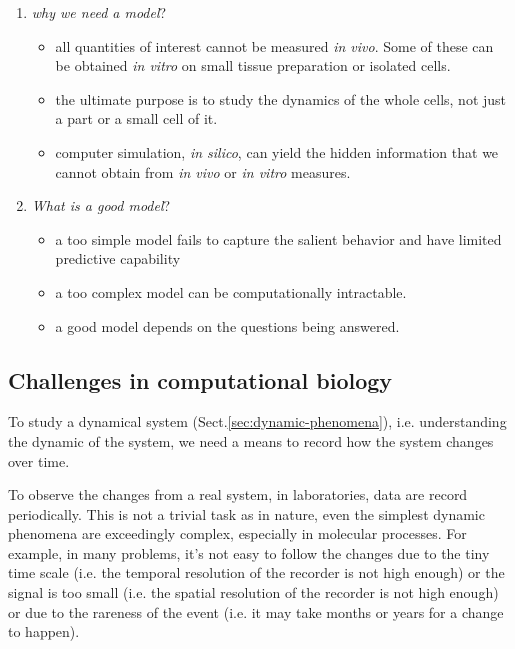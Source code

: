 \begin{enumerate}
\item  {\it why we need a model}?
  \begin{itemize}
  \item all quantities of interest cannot be measured {\it in
      vivo}.
    Some of these can be obtained {\it in vitro} on small tissue
    preparation or isolated cells.

  \item the ultimate purpose is to study the dynamics of the whole
    cells, not just a part or a small cell of it.

  \item computer simulation, {\it in silico}, can yield the hidden
    information that we cannot obtain from {\it in vivo} or
    {\it in vitro} measures.
  \end{itemize}

\item {\it What is a good model}?
  \begin{itemize}
  \item a too simple model fails to capture the salient behavior and
    have limited predictive capability

  \item a too complex model can be computationally intractable.

  \item a good model depends on the questions being answered.
  \end{itemize}
\end{enumerate}

\subsection{Challenges in computational biology}

To study a dynamical system (Sect.\ref{sec:dynamic-phenomena}), i.e.
understanding the dynamic of the system, we need a means to record how the
system changes over time.

To observe the changes from a real system, in laboratories, data are record
periodically. This is not a trivial task as in nature, even the simplest dynamic
phenomena are exceedingly complex, especially in molecular processes.
For example, in many problems, it's not easy to follow the changes due to the
tiny time scale (i.e. the temporal resolution of the recorder is not high
enough) or the signal is too small (i.e. the spatial resolution of the recorder
is not high enough) or due to the rareness of the event (i.e. it may take months
or years for a change to happen).

